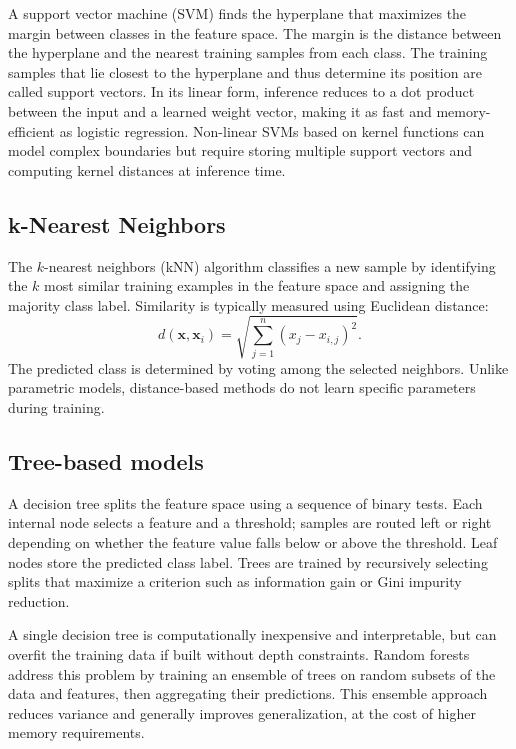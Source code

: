 A support vector machine (SVM) finds the hyperplane that maximizes the margin between classes in the feature space. The margin is the distance between the hyperplane and the nearest training samples from each class. The training samples that lie closest to the hyperplane and thus determine its position are called support vectors. In its linear form, inference reduces to a dot product between the input and a learned weight vector, making it as fast and memory-efficient as logistic regression. Non-linear SVMs based on kernel functions can model complex boundaries but require storing multiple support vectors and computing kernel distances at inference time.

\subsection{k-Nearest Neighbors}
The $k$-nearest neighbors (kNN) algorithm classifies a new sample by identifying the $k$ most similar training examples in the feature space and assigning the majority class label. Similarity is typically measured using Euclidean distance:
\begin{equation}
  d(\mathbf{x}, \mathbf{x}_i)
    = \sqrt{\sum_{j=1}^{n} (x_j - x_{i,j})^2}.
\end{equation}
The predicted class is determined by voting among the selected neighbors. Unlike parametric models, distance-based methods do not learn specific parameters during training.

\subsection{Tree-based models}

A decision tree splits the feature space using a sequence of binary tests. Each internal node selects a feature and a threshold; samples are routed left or right depending on whether the feature value falls below or above the threshold. Leaf nodes store the predicted class label. Trees are trained by recursively selecting splits that maximize a criterion such as information gain or Gini impurity reduction.

A single decision tree is computationally inexpensive and interpretable, but can overfit the training data if built without depth constraints. Random forests address this problem by training an ensemble of trees on random subsets of the data and features, then aggregating their predictions. This ensemble approach reduces variance and generally improves generalization, at the cost of higher memory requirements.

